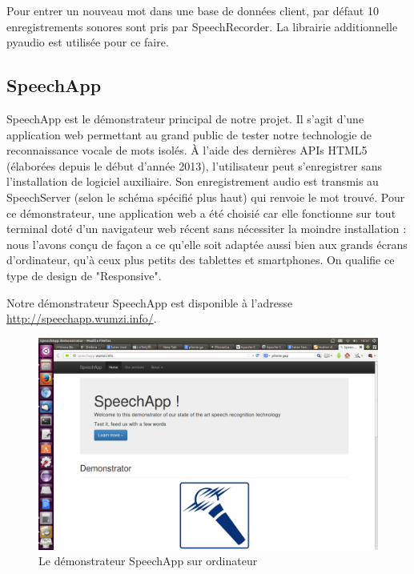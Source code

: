 \documentclass[a4paper,12pt]{report}
\begin{document}
Pour entrer un nouveau mot dans une base de données client, par défaut 10 enregistrements sonores sont pris par SpeechRecorder. La librairie additionnelle pyaudio est utilisée pour ce faire.


\subsection{SpeechApp}

SpeechApp est le démonstrateur principal de notre projet.
Il s'agit d'une application web permettant au grand public de tester notre technologie de reconnaissance vocale de mots isolés.
À l'aide des dernières APIs HTML5 (élaborées depuis le début d'année 2013), l'utilisateur peut s'enregistrer sans l'installation de logiciel auxiliaire. Son enregistrement audio est transmis au SpeechServer (selon le schéma spécifié plus haut) qui renvoie le mot trouvé.
\medskip{}
Pour ce démonstrateur, une application web a été choisié car elle fonctionne sur tout terminal doté d'un navigateur web récent sans nécessiter la moindre installation : nous l'avons conçu de façon a ce qu'elle soit adaptée aussi bien aux grands écrans d'ordinateur, qu'à ceux plus petits des tablettes et smartphones. On qualifie ce type de design de "Responsive".

\bigskip{}

Notre démonstrateur SpeechApp est disponible à l'adresse \url{http://speechapp.wumzi.info/}.


\begin{figure}[H]
	\begin{center}
	\includegraphics[width=14cm]{pics/speechapp-desktop.png} 
	\end{center}
	\caption{Le démonstrateur SpeechApp sur ordinateur}
\end{figure}
\end{document}
